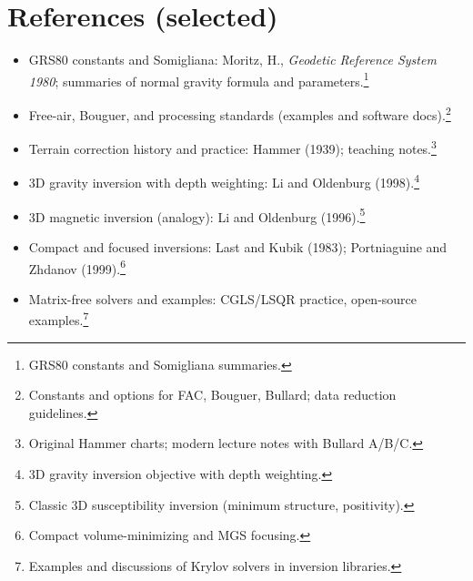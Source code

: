 \documentclass[11pt,a4paper]{article}
\begin{document}
\section*{References (selected)}
\begin{itemize}
  \item GRS80 constants and Somigliana: Moritz, H., \emph{Geodetic Reference System 1980}; summaries of normal gravity formula and parameters.\footnote{GRS80 constants and Somigliana summaries.}
  \item Free-air, Bouguer, and processing standards (examples and software docs).\footnote{Constants and options for FAC, Bouguer, Bullard; data reduction guidelines.}
  \item Terrain correction history and practice: Hammer (1939); teaching notes.\footnote{Original Hammer charts; modern lecture notes with Bullard A/B/C.}
  \item 3D gravity inversion with depth weighting: Li and Oldenburg (1998).\footnote{3D gravity inversion objective with depth weighting.}
  \item 3D magnetic inversion (analogy): Li and Oldenburg (1996).\footnote{Classic 3D susceptibility inversion (minimum structure, positivity).}
  \item Compact and focused inversions: Last and Kubik (1983); Portniaguine and Zhdanov (1999).\footnote{Compact volume-minimizing and MGS focusing.}
  \item Matrix-free solvers and examples: CGLS/LSQR practice, open-source examples.\footnote{Examples and discussions of Krylov solvers in inversion libraries.}
\end{itemize}
\end{document}

